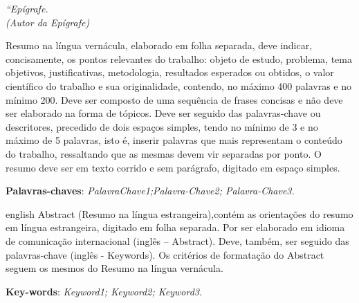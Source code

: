 \documentclass[
	12pt,				%
	oneside,
	a4paper,			%
    sumario=tradicional,%
	chapter=TITLE,		%
	english,			%
	french,				%
	spanish,			%
	brazil,				%
	]{abntex2}
\begin{document}
\begin{epigrafe}
    \vspace*{\fill}
	\begin{flushright}
		\textit{``Epígrafe.\\
		(Autor da Epígrafe)}
	\end{flushright}
\end{epigrafe}


\setlength{\absparsep}{18pt} %
\begin{resumo}

Resumo na língua vernácula, elaborado em folha separada, deve indicar, concisamente, os pontos relevantes do trabalho: objeto de estudo, problema, tema objetivos, justificativas,  metodologia, resultados esperados ou obtidos, o valor científico do trabalho e sua originalidade, contendo, no máximo 400 palavras e no mínimo 200. Deve ser composto de uma sequência de frases concisas e não deve ser elaborado na forma de tópicos. Deve ser seguido das palavras-chave ou descritores, precedido de dois espaços simples, tendo no mínimo de 3 e no máximo de 5 palavras, isto é, inserir palavras que mais representam o conteúdo do trabalho, ressaltando que as mesmas devem vir separadas por ponto. O resumo deve ser em texto corrido e sem parágrafo, digitado em espaço simples. 

 \textbf{Palavras-chaves}: \textit{PalavraChave1;Palavra-Chave2; Palavra-Chave3.} 


\end{resumo}

\begin{resumo}[Abstract]
 \begin{otherlanguage*}{english}
 Abstract (Resumo na língua estrangeira),contém as orientações do resumo em língua estrangeira, digitado em folha separada. Por ser elaborado em idioma de comunicação internacional (inglês – Abstract). Deve, também, ser seguido das palavras-chave (inglês - Keywords). Os critérios de formatação do Abstract seguem os mesmos do Resumo na língua vernácula.  
   
   \textbf{Key-words}: 
   \textit{Keyword1; Keyword2; Keyword3}.
 \end{otherlanguage*}
\end{resumo}



\end{document}
